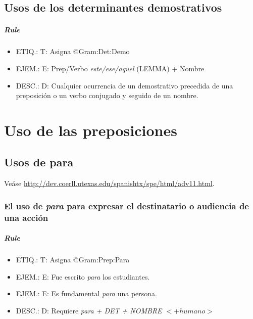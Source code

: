 \documentclass[11pt]{report}
\begin{document}
\section{Usos de los determinantes demostrativos}
\paragraph*{Rule}
\begin{itemize}
\item ETIQ.:  T: Asigna @Gram:Det:Demo
\item EJEM.:  E: Prep/Verbo \emph{este/ese/aquel} (LEMMA) + Nombre
\item DESC.:  D: Cualquier ocurrencia de un demostrativo precedida de una preposición o un verbo conjugado y seguido de un nombre.
\end{itemize}

\chapter{Uso de las preposiciones}
\section{Usos de para}
Veáse \url{http://dev.coerll.utexas.edu/spanishtx/spe/html/adv11.html}.

\subsection{El uso de \emph{para} para expresar el destinatario o audiencia de una acción}
\paragraph*{Rule}
\begin{itemize}
\item ETIQ.:  T: Asigna @Gram:Prep:Para
\item EJEM.:  E: Fue escrito \emph{para} los estudiantes.
\item EJEM.:  E: Es fundamental \emph{para} una persona.
\item DESC.:  D: Requiere \emph{para + DET + NOMBRE $<+humano>$}
\end{itemize}
\end{document}
